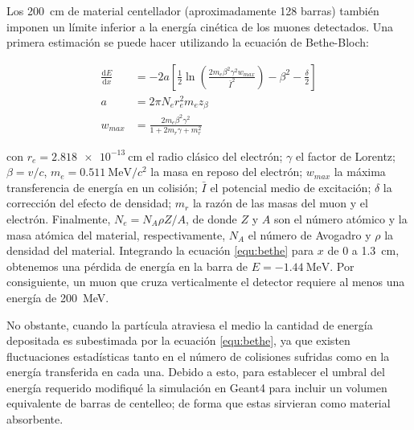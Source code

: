 Los \SI{200}{\cm} de material centellador (aproximadamente \num{128} barras) también imponen un límite inferior a la energía cinética de los muones detectados. Una primera estimación se puede hacer utilizando la ecuación de Bethe-Bloch:

\begin{align}
\label{equ:bethe}
\frac{\mathrm{d}E}{\mathrm{d}x} &=-2a\left[\frac{1}{2}\ln\left(\frac{2m_{e}\beta^{2}\gamma^{2}w_{max}}{\bar{I}^{2}}\right)-\beta^{2}-\frac{\delta}{2}\right] \\
a &=2\pi N_{e}r_{e}^{2}m_{e}z_{\beta}  \nonumber \\
w_{max} &=\frac{2m_{e}\beta^{2}\gamma^{2}}{1+2m_{r}\gamma+m_{r}^{2}} \nonumber
\end{align}

con $r_{e}=\SI{2.818e-13}{\cm}$ el radio clásico del electrón; $\gamma$ el factor de Lorentz; $\beta=v/c$, $m_{e}=\SI{0.511}{\mega\electronvolt\per c^{2}}$ la masa en reposo del electrón; $w_{max}$ la máxima transferencia de energía en un colisión; $\bar{I}$ el potencial medio de excitación; $\delta$ la corrección del efecto de densidad; $m_{r}$ la razón de las masas del muon y el electrón. Finalmente, $N_{e}=N_{A}\rho Z/A$, de donde $Z$ y $A$ son el número atómico y la masa atómica del material, respectivamente, $N_{A}$ el número de Avogadro y $\rho$ la densidad del material. Integrando la ecuación \ref{equ:bethe} para $x$ de \num{0} a \SI{1.3}{\cm}, obtenemos una pérdida de energía en la barra de $E=\SI{-1.44}{\mega\electronvolt}$. Por consiguiente, un muon que cruza verticalmente el detector requiere al menos una energía de \SI{200}{\mega\electronvolt}.

No obstante, cuando la partícula atraviesa el medio la cantidad de energía depositada es subestimada por la ecuación \ref{equ:bethe}, ya que existen fluctuaciones estadísticas tanto en el número de colisiones sufridas como en la energía transferida en cada una. Debido a esto, para establecer el umbral del energía requerido modifiqué la simulación en Geant4 para incluir un volumen equivalente de barras de centelleo; de forma que estas sirvieran como material absorbente.

